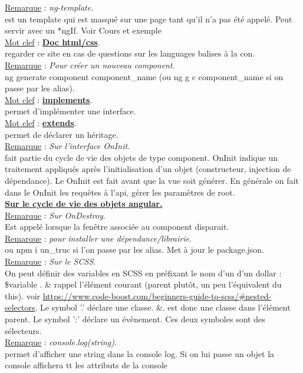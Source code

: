 \documentclass[a4paper,12pt,twoside]{article}
\newcommand{\urlcolor}{magenta}  %
\newcommand{\keycolor}{purple} %
\newcommand{\incode}[1]{{\footnotesize\ttfamily #1}} %
\newcommand{\rem}[2]{\noindent\underline{Remarque} : \textit{#1}.\\ \indent #2}
\newcommand{\keyref}[2]{\hypersetup{urlcolor=\keycolor} \href{#1}{\textbf{#2}}\hypersetup{urlcolor=\urlcolor}}
\newcommand{\keyword}[3]{\noindent\underline{Mot clef} : \keyref{#1}{#2}. \\ \indent #3}
\begin{document}
\rem{ng-template}{est un template qui est masqué sur une page tant qu'il n'a pas été appelé. Peut servir avec un *ngIf. Voir Cours et exemple}\\

\keyword{https://developer.mozilla.org/fr/}{Doc html/css}{regarder ce site en cas de questions sur les languages balises à la con.}\\

\rem{Pour créer un nouveau component}{ng generate component component\_name (ou ng g c component\_name si on passe par les alias).}\\

\keyword{}{implements}{permet d'implémenter une interface.}\\

\keyword{}{extends}{permet de déclarer un héritage.}\\

\rem{Sur l'interface OnInit}{fait partie du cycle de vie des objets de type component. OnInit indique un traitement appliqués après l'initialisation d'un objet (constructeur, injection de dépendance). Le OnInit est fait avant que la vue soit générer. En générale on fait dans le OnInit les requêtes à l'api, gérer les paramètres de root.}\\

\keyref{https://www.cuelogic.com/blog/angular-lifecycle}{Sur le cycle de vie des objets angular.}\\

\rem{Sur OnDestroy}{Est appelé lorsque la fenêtre associée au component disparait. }\\

\rem{pour installer une dépendance/librairie}{\incode{npm install un\_truc} ou \incode{npm i un\_truc} si l'on passe par les alias. Met à jour le package.json.}\\

\rem{Sur le SCSS}{On peut définir des variables en SCSS en préfixant le nom d'un d'un dollar : \$variable . \& rappel l'élément courant (parent plutôt, un peu l'équivalent du this). voir \url{https://www.code-boost.com/beginners-guide-to-scss/\#nested-selectors}. Le symbol '.' déclare une classe. \&. est donc une classe dans l'élément parent. Le symbol ':' déclare un évènement. Ces deux symboles sont des sélecteurs.}\\

\rem{console.log(string)}{permet d'afficher une string dans la console log. Si on lui passe un objet la console affichera tt les attributs de la console}\\
\end{document}
